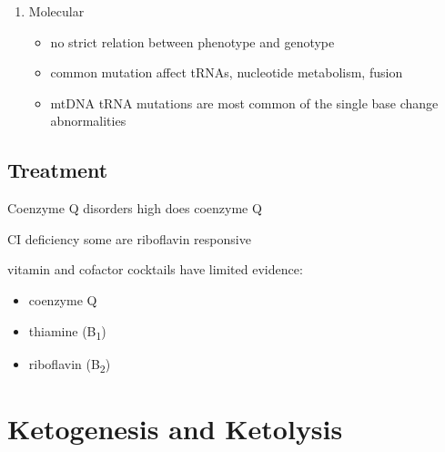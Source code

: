 \documentclass{scrartcl}
\begin{document}
\begin{enumerate}
\item Molecular
\label{sec:org4d16c20}
\begin{itemize}
\item no strict relation between phenotype and genotype
\item common mutation affect tRNAs, nucleotide metabolism, fusion
\item mtDNA tRNA mutations are most common of the single base change abnormalities
\end{itemize}
\end{enumerate}

\subsection{Treatment}
\label{sec:orgd27cb66}
\begin{description}
\item{Coenzyme Q disorders} high does coenzyme Q
\item{CI deficiency} some are riboflavin responsive
\item vitamin and cofactor cocktails have limited evidence:
\begin{itemize}
\item coenzyme Q
\item thiamine (B\textsubscript{1})
\item riboflavin (B\textsubscript{2})
\end{itemize}
\end{description}
\section{Ketogenesis and Ketolysis}
\label{sec:org5514f0e}
\end{document}
